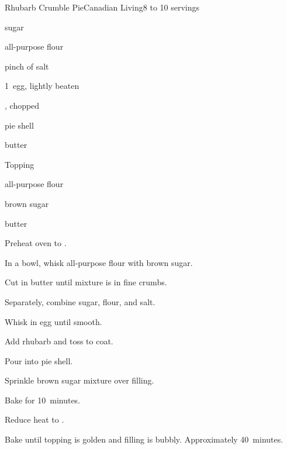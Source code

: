 \begin{recipe}{Rhubarb Crumble Pie}{Canadian Living}{8 to 10 servings}

\begin{ingredients}
\item \C{1\quarter} sugar
\item {} all-purpose flour
\item pinch of salt
\item 1~egg, lightly beaten
\item {} , chopped
\item pie shell
\item {} butter
\end{ingredients}
Topping
\begin{ingredients}
\item \C{\threequarter} all-purpose flour
\item \C{\third} brown sugar
\item \C{\third} butter
\end{ingredients}

\begin{directions}
\item Preheat oven to .
\item In a bowl, whisk \C{\threequarter} all-purpose flour with brown sugar.
\item Cut in \C{\third} butter until mixture is in fine crumbs.
\item Separately, combine sugar,  flour, and salt.
\item Whisk in egg until smooth.
\item Add rhubarb and toss to coat.
\item Pour into pie shell.
\item Sprinkle brown sugar mixture over filling.
\item Bake for 10~minutes.
\item Reduce heat to .
\item Bake until topping is golden and filling is bubbly. Approximately 40~minutes.  
\end{directions}

\end{recipe}
